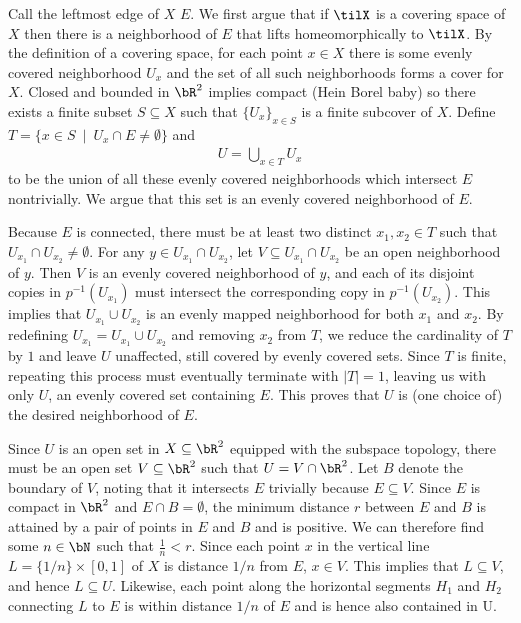 \begin{homework}[e]
\begin{prf}
    Call the leftmost edge of $X$ $E$. We first argue that if $\tilX$ is a covering space of $X$ then there is a neighborhood of $E$ that lifts homeomorphically to $\tilX$. By the definition of a covering space, for each point $x \in X$ there is some evenly covered neighborhood $U_x$ and the set of all such neighborhoods forms a cover for $X$. Closed and bounded in $\bR^2$ implies compact (Hein Borel baby) so there exists a finite subset $S\subseteq X$ such that $\{U_x\}_{x\in S}$ is a finite subcover of $X$. Define $T = \{x \in S ~\mid~ U_x \cap E \neq \emptyset\}$ and
    \begin{align*}
      U = \bigcup_{x\in T} U_x
    \end{align*}
    to be the union of all these evenly covered neighborhoods which intersect $E$ nontrivially. We argue that this set is an evenly covered neighborhood of $E$.

    Because $E$ is connected, there must be at least two distinct $x_1,x_2 \in T$ such that $U_{x_1}\cap U_{x_2} \neq \emptyset$. For any $y \in U_{x_1} \cap U_{x_2}$, let $V\subseteq U_{x_1} \cap U_{x_2}$ be an open neighborhood of $y$. Then $V$ is an evenly covered neighborhood of $y$, and each of its disjoint copies in $p^{-1}(U_{x_1})$ must intersect the corresponding copy in $p^{-1}(U_{x_2})$. This implies that $U_{x_1}\cup U_{x_2}$ is an evenly mapped neighborhood for both $x_1$ and $x_2$. By redefining $U_{x_1} = U_{x_1}\cup U_{x_2}$ and removing $x_2$ from $T$, we reduce the cardinality of $T$ by $1$ and leave $U$ unaffected, still covered by evenly covered sets. Since $T$ is finite, repeating this process must eventually terminate with $|T| = 1$, leaving us with only $U$, an evenly covered set containing $E$. This proves that $U$ is (one choice of) the desired neighborhood of $E$.

    Since $U$ is an open set in $X\subseteq \bR^2$ equipped with the subspace topology, there must be an open set $V \subseteq \bR^2$ such that $U = V\cap \bR^2$. Let $B$ denote the boundary of $V$, noting that it intersects $E$ trivially because $E\subseteq V$. Since $E$ is compact in $\bR^2$ and $E\cap B = \emptyset$, the minimum distance $r$ between $E$ and $B$ is attained by a pair of points in $E$ and $B$ and is positive. We can therefore find some $n\in \bN$ such that $\frac{1}{n}< r$. Since each point $x$ in the vertical line $L = \{1/n\}\times [0,1]$ of $X$ is distance $1/n$ from $E$, $x \in V$. This implies that $L\subseteq V$, and hence $L \subseteq U$. Likewise, each point along the horizontal segments $H_1$ and $H_2$ connecting $L$ to $E$ is within distance $1/n$ of $E$ and is hence also contained in U.


\end{prf}
\end{homework}

